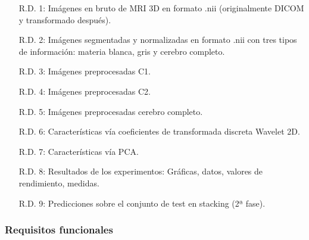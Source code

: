 \begin{itemize}
	\item[R.D. 1:] Imágenes en bruto de MRI 3D en formato .nii (originalmente DICOM y transformado después).
	\item[R.D. 2:] Imágenes segmentadas y normalizadas en formato .nii con tres tipos de información: materia blanca, gris y cerebro completo.
	\item[R.D. 3:] Imágenes preprocesadas C1.
	\item[R.D. 4:] Imágenes preprocesadas C2.
	\item[R.D. 5:] Imágenes preprocesadas cerebro completo.
	\item[R.D. 6:] Características vía coeficientes de transformada discreta Wavelet 2D.
	\item[R.D. 7:] Características vía PCA.
	\item[R.D. 8:] Resultados de los experimentos: Gráficas, datos, valores de rendimiento, medidas.
	\item[R.D. 9:] Predicciones sobre el conjunto de test en stacking (2ª fase).
\end{itemize}

\subsubsection{Requisitos funcionales}

